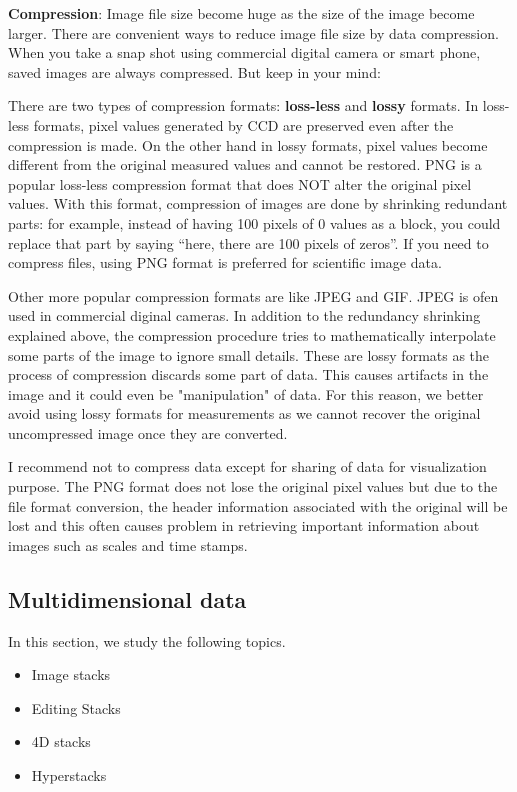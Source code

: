\textbf{Compression}: Image file size become huge as the size of the image become larger. There are convenient ways to reduce image file size by data compression. When you take a snap shot using commercial digital camera or smart phone, saved images are always compressed.  
But keep in your mind:

There are two types of compression formats: \textbf{loss-less} and \textbf{lossy} formats. In loss-less formats, pixel values generated by CCD are preserved even after the compression is made. On the other hand in lossy formats, pixel values become different from the original measured values and cannot be restored. 
PNG is a popular loss-less compression format that does NOT alter the original pixel values. With this format, compression of images are done by shrinking redundant parts: for example, instead of having 100 pixels of 0 values as a block, you could replace that part by saying ``here, there are 100 pixels of zeros''. If you need to compress files, using PNG format is preferred for scientific image data.  

Other more popular compression formats are like JPEG and GIF. JPEG is ofen used in commercial diginal cameras.  In addition to the redundancy shrinking explained above, the compression procedure tries to mathematically interpolate some parts of the image to ignore small details. These are lossy formats as
the process of compression discards some part of data. This causes artifacts in the image and it could even be "manipulation" of data. For this reason, we better avoid using lossy formats
for measurements as we cannot recover the original uncompressed image once they are converted. 

I recommend not to compress data except for sharing of data for visualization purpose. The PNG format does not lose the original pixel values but due to the file format conversion, the header information associated with the original will be lost and this often causes problem in retrieving important information about images such as scales and time stamps. 

\subsection{Multidimensional data}
\label{sec:stackBasics}

In this section, we study the following topics.

\begin{itemize}
    \item Image stacks
    \item Editing Stacks
    \item 4D stacks
	\item Hyperstacks
\end{itemize}

